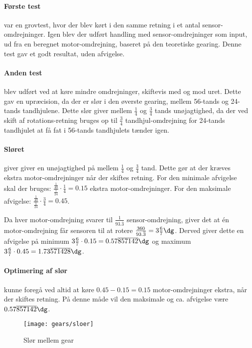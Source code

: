 \paragraph{Første test} var en grovtest, hvor der blev kørt i den samme retning i et antal sensor-omdrejninger.
Igen blev der udført handling med sensor-omdrejninger som input, ud fra en beregnet motor-omdrejning, baseret på den teoretiske gearing.
Denne test gav et godt resultat, uden afvigelse.

\paragraph{Anden test} blev udført ved at køre mindre omdrejninger, skiftevis med og mod uret.
Dette gav en upræcision, da der er slør i den øverste gearing, mellem 56-tands og 24-tands tandhjulene.
Dette slør giver mellem $\frac{1}{4}$ og $\frac{3}{4}$ tands unøjagtighed, da der ved skift af rotations-retning bruges op til $\frac{3}{4}$ tandhjul-omdrejning for 24-tands tandhjulet at få fat i 56-tands tandhjulets tænder igen.

\paragraph{Sløret} giver giver en unøjagtighed på mellem $\frac{1}{4}$ og $\frac{3}{4}$ tand.
Dette gør at der kræves ekstra motor-omdrejninger når der skiftes retning.
For den minimale afvigelse skal der bruges: $ \frac{\frac{1}{40}}{\frac{1}{24}}\cdot\frac{1}{4} = 0.15$ ekstra motor-omdrejninger.
For den maksimale afvigelse: $ \frac{\frac{1}{40}}{\frac{1}{24}}\cdot\frac{3}{4} = 0.45$.

Da hver motor-omdrejning svarer til $\frac{1}{93.\overline{3}}$ sensor-omdrejning, giver det at én motor-omdrejning får sensoren til at rotere $\frac{360}{93.\overline{3}} = 3\frac{6}{7}\dg$.
Derved giver dette en afvigelse på minimum $3\frac{6}{7}\cdot0.15 = 0.57\overline{857142}\dg$ og maximum $3\frac{6}{7}\cdot0.45 = 1.73\overline{571428}\dg$.

\paragraph{Optimering af slør} kunne foregå ved altid at køre $0.45 - 0.15 = 0.15$ motor-omdrejninger ekstra, når der skiftes retning.
På denne måde vil den maksimale og ca. afvigelse være $0.57\overline{857142}\dg$.

\begin{figure}[h]
\centering
\texttt{[image: gears/sloer]}
\caption{Slør mellem gear}
\label{gearing:sloer}
\end{figure}